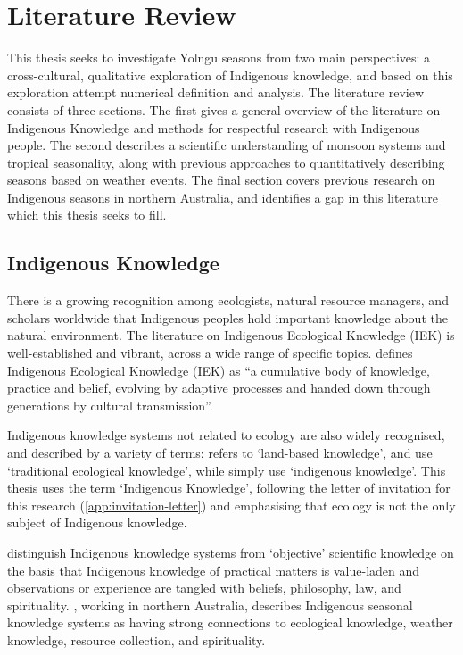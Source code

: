 \chapter{Literature Review}
\label{ch:lit-review}

This thesis seeks to investigate Yolngu seasons from two main perspectives:
a cross-cultural, qualitative exploration of Indigenous knowledge, and
based on this exploration attempt numerical definition and analysis.
%
The literature review consists of three sections.  The first gives a general
overview of the literature on Indigenous Knowledge and methods for respectful
research with Indigenous people.  The second describes a scientific
understanding of monsoon systems and tropical seasonality, along with previous
approaches to quantitatively describing seasons based on weather events.
The final section covers previous research on Indigenous seasons in northern
Australia, and identifies a gap in this literature which this thesis seeks
to fill.


\section{Indigenous Knowledge}
\label{sec:lit-iek}

There is a growing recognition among ecologists, natural resource managers, and
scholars worldwide that Indigenous peoples hold important knowledge about the
natural environment.  The literature on Indigenous Ecological Knowledge (IEK)
is well-established and vibrant, across a wide range of specific topics.
\citet{berkes2012} defines Indigenous Ecological Knowledge (IEK) as ``a cumulative
body of knowledge, practice and belief, evolving by adaptive processes and
handed down through generations by cultural transmission''.

Indigenous knowledge systems not related to ecology are also widely recognised,
and described by a variety of terms:  \citet{clarke2009} refers to `land-based
knowledge', \citet{petheram2010} and \citet{turner2009} use `traditional
ecological knowledge', while \citet{cochran2015} simply use `indigenous
knowledge'.  This thesis uses the term `Indigenous Knowledge', following the
letter of invitation for this research (\cref{app:invitation-letter}) and
emphasising that ecology is not the only subject of Indigenous knowledge.


\citet{turner2009} distinguish Indigenous knowledge systems from `objective'
scientific knowledge on the basis that Indigenous knowledge of practical
matters is value-laden and observations or experience are tangled with beliefs,
philosophy, law, and spirituality.  \citet{woodward2012b}, working in northern
Australia, describes Indigenous seasonal knowledge systems as having strong connections
to ecological knowledge, weather knowledge, resource collection, and spirituality.

